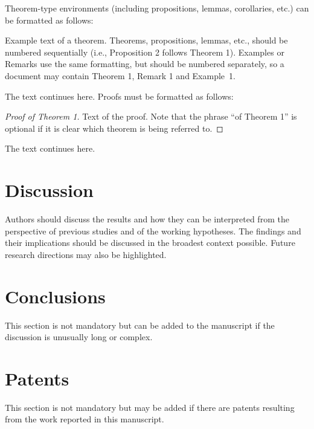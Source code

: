 \documentclass[geosciences,article,submit,moreauthors]{Definitions/mdpi}
\begin{document}
Theorem-type environments (including propositions, lemmas, corollaries, etc.) can be formatted as follows:
\begin{Theorem}
Example text of a theorem. Theorems, propositions, lemmas, etc., should be numbered sequentially (i.e., Proposition 2 follows Theorem 1). Examples or Remarks use the same formatting, but should be numbered separately, so a document may contain Theorem 1, Remark 1 and Example~1.
\end{Theorem}

The text continues here. Proofs must be formatted as follows:

\begin{proof}[Proof of Theorem 1]
Text of the proof. Note that the phrase ``of Theorem 1'' is optional if it is clear which theorem is being referred to.
\end{proof}
The text continues here.

\section{Discussion}

Authors should discuss the results and how they can be interpreted from the perspective of previous studies and of the working hypotheses. The findings and their implications should be discussed in the broadest context possible. Future research directions may also be highlighted.

\section{Conclusions}

This section is not mandatory but can be added to the manuscript if the discussion is unusually long or complex.

\section{Patents}

This section is not mandatory but may be added if there are patents resulting from the work reported in this manuscript.

\vspace{6pt} 

\end{document}
